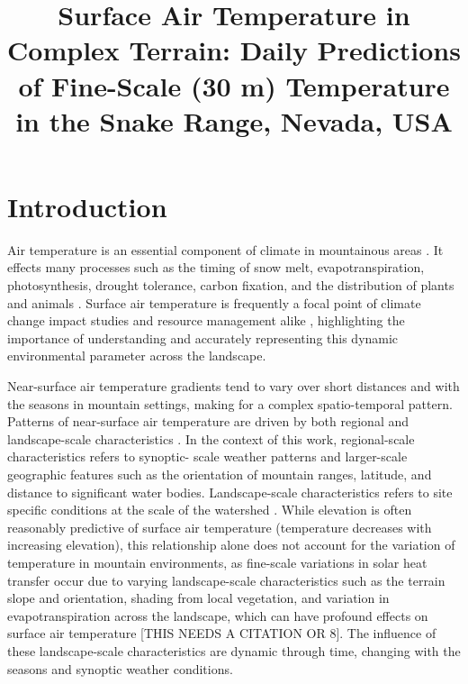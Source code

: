 \documentclass{ametsoc}
\title{Surface Air Temperature in Complex Terrain: Daily Predictions of Fine-Scale (30 m) Temperature in the Snake Range, Nevada, USA}
\affiliation{Department of Geography, University of Nevada, Reno, Reno, Nevada, United States of America}
\begin{document}
\maketitle


%
\section{Introduction}
Air temperature is an essential component of climate in mountainous 
areas \citep{Lookingbill2003,Barry2008}.  It effects many processes 
such as the timing of snow melt, evapotranspiration, photosynthesis, 
drought tolerance, carbon fixation, and the distribution of plants and animals 
\citep{Cabrera1998,Barry2008,Adams2009,Geiger2009,Crimmins2011}. 
Surface air temperature is frequently a focal point of climate 
change impact studies and resource management alike 
\citep{Diaz2003a,Millar2007}, highlighting the importance of 
understanding and accurately representing this dynamic environmental 
parameter across the landscape.

Near-surface air temperature gradients tend to vary over short distances  and
with the seasons in mountain settings, making for a complex spatio-temporal
pattern.  Patterns of near-surface air temperature are driven by both regional
and landscape-scale characteristics \citep{Steinhauser1967,Dobrowski2009}.  In
the context of this work, regional-scale characteristics refers to synoptic-
scale  weather patterns and larger-scale geographic features such as the
orientation of  mountain ranges, latitude, and distance to significant water
bodies. Landscape-scale  characteristics refers to site specific conditions at
the scale of the watershed \citep{Dobrowski2009}. While elevation is often
reasonably predictive of surface air temperature (temperature decreases with
increasing elevation), this relationship alone does not account for the
variation of temperature in mountain environments, as fine-scale variations in
solar heat transfer occur due to varying landscape-scale characteristics such as
the terrain slope and orientation, shading from local vegetation, and variation
in evapotranspiration across the landscape, which can have profound effects on
surface air temperature [THIS NEEDS A CITATION OR 8].   The influence of these
landscape-scale characteristics are dynamic through time, changing  with the
seasons and synoptic weather conditions.
\end{document}
